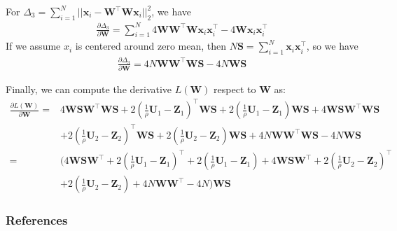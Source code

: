 \documentclass{article} %
\begin{document}
For $\Delta_3=\sum_{i=1}^{N}||\mathbf{x}_i-\mathbf{W}^{\top}\mathbf{W}\mathbf{x}_i||_2^2$, we have
\begin{align}
\frac{\partial \Delta_3}{\partial \mathbf{W}} = \sum_{i=1}^{N}4\mathbf{W}\mathbf{W}^{\top}\mathbf{W}\mathbf{x}_i\mathbf{x}_i^{\top}-4\mathbf{W}\mathbf{x}_i\mathbf{x}_i^{\top}
\end{align}
If we assume $x_i$ is centered around zero mean, then $N\mathbf{S}=\sum_{i=1}^{N}\mathbf{x}_i\mathbf{x}_i^{\top}$, so we have
\begin{align}
\frac{\partial \Delta_3}{\partial \mathbf{W}} = 4N\mathbf{W}\mathbf{W}^{\top}\mathbf{W}\mathbf{S}-4N\mathbf{W}\mathbf{S}
\end{align}

Finally, we can compute the derivative $L(\mathbf{W})$ respect to $\mathbf{W}$ as:
\begin{align}
\frac{\partial L(\mathbf{W})}{\partial \mathbf{W}} =& 4\mathbf{W}\mathbf{S}\mathbf{W}^{\top}\mathbf{W}\mathbf{S} + 2(\frac{1}{\rho}\mathbf{U}_1-\mathbf{Z}_1)^{\top}\mathbf{W}\mathbf{S}+2(\frac{1}{\rho}\mathbf{U}_1-\mathbf{Z}_1)\mathbf{W}\mathbf{S}+
4\mathbf{W}\mathbf{S}\mathbf{W}^{\top}\mathbf{W}\mathbf{S} \nonumber\\
&+2(\frac{1}{\rho}\mathbf{U}_2-\mathbf{Z}_2)^{\top}\mathbf{W}\mathbf{S}+2(\frac{1}{\rho}\mathbf{U}_2-\mathbf{Z}_2)\mathbf{W}\mathbf{S}
+4N\mathbf{W}\mathbf{W}^{\top}\mathbf{W}\mathbf{S}-4N\mathbf{W}\mathbf{S}\\
=&(4\mathbf{W}\mathbf{S}\mathbf{W}^{\top} + 2(\frac{1}{\rho}\mathbf{U}_1-\mathbf{Z}_1)^{\top}+2(\frac{1}{\rho}\mathbf{U}_1-\mathbf{Z}_1)+
4\mathbf{W}\mathbf{S}\mathbf{W}^{\top} \nonumber
+2(\frac{1}{\rho}\mathbf{U}_2-\mathbf{Z}_2)^{\top}\nonumber\\
&+2(\frac{1}{\rho}\mathbf{U}_2-\mathbf{Z}_2)
+4N\mathbf{W}\mathbf{W}^{\top}-4N)\mathbf{W}\mathbf{S}
\end{align}




\subsubsection*{References}
\end{document}
